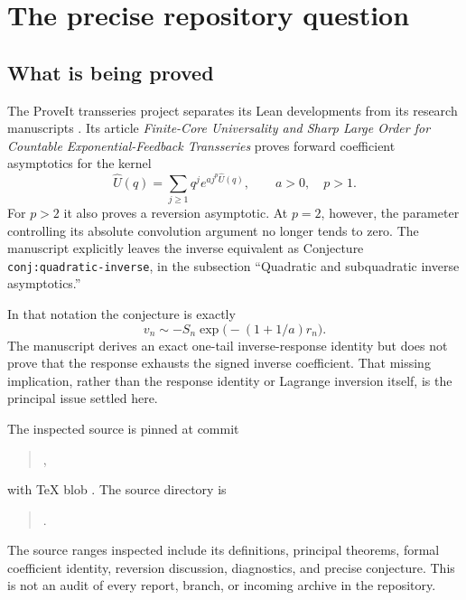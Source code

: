 \documentclass[11pt,a4paper]{article}
\numberwithin{equation}{section}
\theoremstyle{definition}
\theoremstyle{remark}
\newcommand{\Uhat}{\widehat U}\newcommand{\Vhat}{\widehat V}
\begin{document}
\clearpage
\setcounter{tocdepth}{1}\hypersetup{bookmarksdepth=2}
\tableofcontents
\clearpage

\section{The precise repository question}
\label{sec:context}

\subsection{What is being proved}

The ProveIt transseries project separates its Lean developments from its
research manuscripts \cite{repo}. Its article \emph{Finite-Core Universality
and Sharp Large Order for Countable Exponential-Feedback Transseries}
\cite{finitecore} proves forward coefficient asymptotics for the kernel
\[
 \Uhat(q)=\sum_{j\ge1}q^j e^{a j^p\Uhat(q)},\qquad a>0,\quad p>1.
\]
For $p>2$ it also proves a reversion asymptotic. At $p=2$, however, the
parameter controlling its absolute convolution argument no longer tends
to zero. The manuscript explicitly leaves the inverse equivalent as
Conjecture \texttt{conj:quadratic-inverse}, in the subsection
``Quadratic and subquadratic inverse asymptotics.''

In that notation the conjecture is exactly
\begin{equation}
 v_n\sim-S_n\exp\!\bigl(-(1+1/a)r_n\bigr).
 \label{eq:target}
\end{equation}
The manuscript derives an exact one-tail inverse-response identity but does
not prove that the response exhausts the signed inverse coefficient.
That missing implication, rather than the response identity or Lagrange
inversion itself, is the principal issue settled here.

The inspected source is pinned at commit
\begin{quote}\small
{},
\end{quote}
with TeX blob
.
The source directory is
\begin{quote}\small
{}.
\end{quote}
The source ranges inspected include its definitions, principal theorems,
formal coefficient identity, reversion discussion, diagnostics, and precise
conjecture. This is not an audit of every report, branch, or incoming archive
in the repository.
\end{document}
